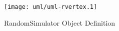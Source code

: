 \begin{figure}[htp]
  \begin{center}
    \texttt{[image: uml/uml-rvertex.1]}

    \caption{RandomSimulator Object Definition}
    \label{fig:sim-class}
  \end{center}
\end{figure}
